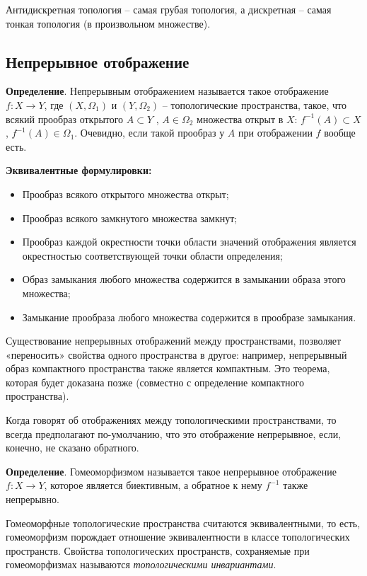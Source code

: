\documentclass[a4paper]{book}
\begin{document}
Антидискретная топология -- самая грубая топология, а дискретная -- самая тонкая топология (в произвольном множестве). 

\subsection{Непрерывное отображение}

\textbf{Определение}. Непрерывным отображением называется такое отображение $f: X\rightarrow Y$, где $(X,\Omega_1)$ и $(Y,\Omega_2)$ -- топологические пространства, такое, что всякий прообраз открытого $ A \subset Y$ , $A\in\Omega_2$ множества открыт в $X$: $f^{-1}(A)\subset X$ , $f^{-1}(A)\in\Omega_1$. Очевидно, если такой прообраз у $A$ при отображении $f$ вообще есть. 

\textbf{Эквивалентные формулировки:} 
\begin{itemize}
	\item Прообраз всякого открытого множества открыт;
	\item Прообраз всякого замкнутого множества замкнут;
	\item Прообраз каждой окрестности точки области значений отображения является окрестностью соответствующей точки области определения;
	\item Образ замыкания любого множества содержится в замыкании образа этого множества;
	\item Замыкание прообраза любого множества содержится в прообразе замыкания.
\end{itemize}

Существование непрерывных отображений между пространствами, позволяет «переносить» свойства одного пространства в другое: например, непрерывный образ компактного пространства также является компактным. Это теорема, которая будет доказана позже (совместно с определение компактного пространства). 

Когда говорят об отображениях между топологическими пространствами, то всегда предполагают по-умолчанию, что это отображение непрерывное, если, конечно, не сказано обратного. 

\textbf{Определение}. Гомеоморфизмом называется такое непрерывное отображение $f: X\rightarrow Y$, которое является биективным, а обратное к нему $f^{-1}$ также непрерывно. 

Гомеоморфные топологические пространства считаются эквивалентными, то есть, гомеоморфизм порождает отношение эквивалентности в классе топологических пространств. Свойства топологических пространств, сохраняемые при гомеоморфизмах называются \textit{топологическими инвариантами}. 
\end{document}
